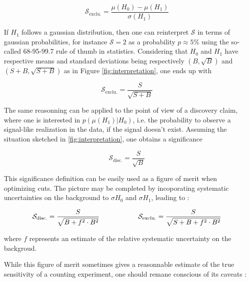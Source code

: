     $$ \mathcal{S}_\text{exclu.} = \frac{\mu(H_0) - \mu(H_1)}{\sigma(H_1)}$$

    If $H_1$ follows a gaussian distribution, then one can reinterpret $\mathcal{S}$ in terms
    of gaussian probabilities, for instance $\mathcal{S} = 2$ as a probability $p\approx5\%$ 
    using the so-called 68-95-99.7 rule of thumb in statistics. Considering
    that $H_0$ and $H_1$ have respective means and standard deviations being respectively
    $(B,\sqrt{B})$ and $(S+B,\sqrt{S+B})$ as in Figure \ref{fig:interpretation}, one ends 
    up with 

    $$ \mathcal{S}_\text{exclu.} = \frac{S}{\sqrt{S+B}}$$

    The same reasonning can be applied to the point of view of a discovery claim, where
    one is interested in $p(\mu(H_1)|H_0)$, i.e. the probability to observe a 
    signal-like realization in the data, if the signal doesn't exist. Assuming the situation
    sketched in \ref{fig:interpretation}, one obtains a significance

    $$ \mathcal{S}_\text{disc.} = \frac{S}{\sqrt{B}}$$

    This significance definition can be easily used as a figure of merit when optimizing
    cuts. The picture may be completed by incoporating systematic uncertainties on the
    background to $\sigma{H_0}$ and $\sigma{H_1}$, leading to :
    
    \begin{equation}
       \mathcal{S}_\text{disc.} = \frac{S}{\sqrt{B+f^2 \cdot B^2}}
       \hspace*{2cm} 
       \mathcal{S}_\text{exclu.} = \frac{S}{\sqrt{S+B+f^2 \cdot B^2}}
       \label{FoM}
   \end{equation}

    where $f$ represents an estimate of the relative systematic uncertainty on the backgroud.
    
    While this figure of merit sometimes gives a reasonnable estimate of the true 
    sensitivity of a counting experiment, one should remane conscious of its caveats 
    \cite{Punzi} :

